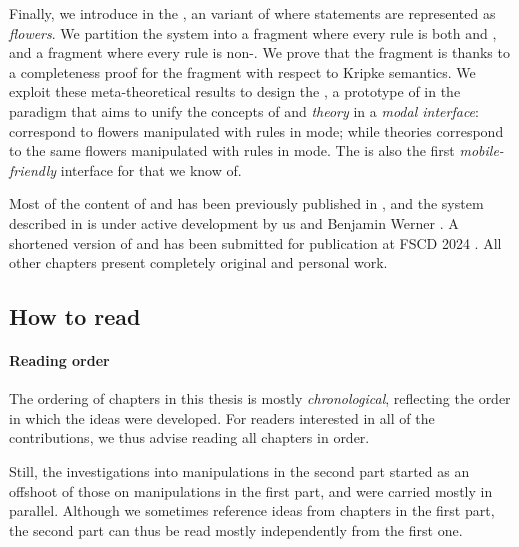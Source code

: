 \begin{description}
  \AP
  Finally, we introduce in  the , an
   variant of  where statements are represented
   as \emph{flowers}. We partition the system into a
  \emph{} fragment where every rule is both  and
  , and a \emph{} fragment where every rule is
  non-. We prove that the  fragment is
   thanks to a completeness proof for the  fragment
  with respect to Kripke semantics. We exploit these meta-theoretical results to
  design the , a prototype of  in the 
  paradigm that aims to unify the concepts of \emph{} and \emph{theory}
  in a \emph{modal interface}:  correspond to flowers manipulated with
   rules in \Proof mode; while theories correspond to the same
  flowers manipulated with  rules in \Edit mode. The
   is also the first \emph{mobile-friendly} interface for
   that we know of.
\end{description}

\begin{kaonote}
Most of the content of  and  has been previously published
in \cite{10.1145/3497775.3503692}, and the  system described
in  is under active development by us and Benjamin Werner
\cite{coq-actema}. A shortened version of  and  has
been submitted for publication at FSCD 2024 \cite{flower-calculus}. All other
chapters present completely original and personal work.
\end{kaonote}

\subsection{How to read}

\paragraph{Reading order}

The ordering of chapters in this thesis is mostly \emph{chronological},
reflecting the order in which the ideas were developed. For readers interested
in all of the contributions, we thus advise reading all chapters in order.

Still, the investigations into  manipulations in the second part started
as an offshoot of those on  manipulations in the first part, and were
carried mostly in parallel. Although we sometimes reference ideas from chapters
in the first part, the second part can thus be read mostly independently from
the first one.

